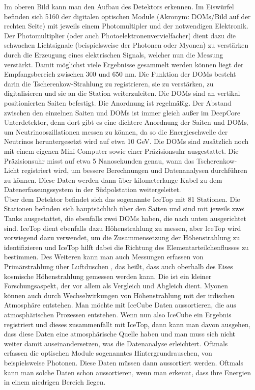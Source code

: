     Im oberen Bild kann man den Aufbau des Detektors erkennen. 
    Im Eiswürfel befinden sich 5160 der digitalen optischen Module (Akronym: DOMs/Bild auf der rechten Seite) 
    mit jeweils einem Photomultipler und der notwendigen Elektronik. Der Photomultiplier 
    (oder auch Photoelektronenvervielfacher) dient dazu die schwachen Lichtsignale 
    (beispielsweise der Photonen oder Myonen) zu verstärken durch die Erzeugung eines elektrischen Signals, 
    welcher nun die Messung verstärkt. Damit möglichst viele Ergebnisse gesammelt werden können liegt der 
    Empfangsbereich zwischen 300 und 650 nm. Die Funktion der DOMs besteht darin die Tscherenkow-Strahlung 
    zu registrieren, sie zu verstärken, zu digitalisieren und sie an die Station weiterzuleiten. 
    Die DOMs sind an vertikal positionierten \grqq Saiten\grqq{} befestigt. Die Anordnung ist regelmäßig. 
    Der Abstand zwischen den einzelnen Saiten und DOMs ist immer gleich außer im DeepCore Unterdetektor, 
    denn dort gibt es eine dichtere Anordnung der Saiten und DOMs, um Neutrinooszillationen messen zu können, 
    da so die Energieschwelle der Neutrinos heruntergesetzt wird auf etwa 10 GeV. 
    Die DOMs sind zusätzlich noch mit einem eigenen Mini-Computer sowie einer Präzisionsuhr ausgestattet. 
    Die Präzisionsuhr misst auf etwa 5 Nanosekunden genau, wann das Tscherenkow-Licht registriert wird, 
    um bessere Berechnungen und Datenanalysen durchführen zu können. 
    Diese Daten werden dann über kilometerlange Kabel zu dem Datenerfassungssystem in der Südpolstation 
    weitergeleitet. \\
    Über dem Detektor befindet sich das sogenannte IceTop mit 81 Stationen. Die Stationen befinden sich 
    hauptsächlich über den Saiten und sind mit jeweils zwei Tanks ausgestattet, die ebenfalls zwei DOMs haben, 
    die nach unten ausgerichtet sind. IceTop dient ebenfalls dazu Höhenstrahlung zu messen, aber IceTop wird 
    vorwiegend dazu verwendet, um die Zusammensetzung der Höhenstrahlung  zu identifizieren und IceTop hilft 
    dabei die Richtung des Elementarteilchenflusses zu bestimmen. Des Weiteren kann man auch Messungen erfassen 
    von Primärstrahlung über \grqq Luftduschen\grqq{} , das heißt, dass auch oberhalb des Eises kosmische Höhenstrahlung 
    gemessen werden kann. Die ist ein kleiner Forschungsaspekt, der vor allem als Vergleich und Abgleich dient. 
    Myonen können auch durch Wechselwirkungen von Höhenstrahlung mit der irdischen Atmosphäre entstehen. 
    Man möchte mit IceCube Daten aussortieren, die aus atmosphärischen Prozessen entstehen. 
    Wenn nun also IceCube ein Ergebnis registriert und dieses zusammenfällt mit IceTop, dann kann man davon 
    ausgehen, dass diese Daten eine atmosphärische Quelle haben und man muss sich nicht weiter damit 
    auseinandersetzen, was die Datenanalyse erleichtert. \cite{BachJoHa}
    Oftmals erfassen die optischen Module sogenanntes Hintergrundrauschen, von beispielsweise Photonen. 
    Diese Daten müssen dann aussortiert werden. Oftmals kann man solche Daten schon aussortieren, wenn man 
    erkennt, dass ihre Energien in einem niedrigen Bereich liegen. \cite{DESY16}

